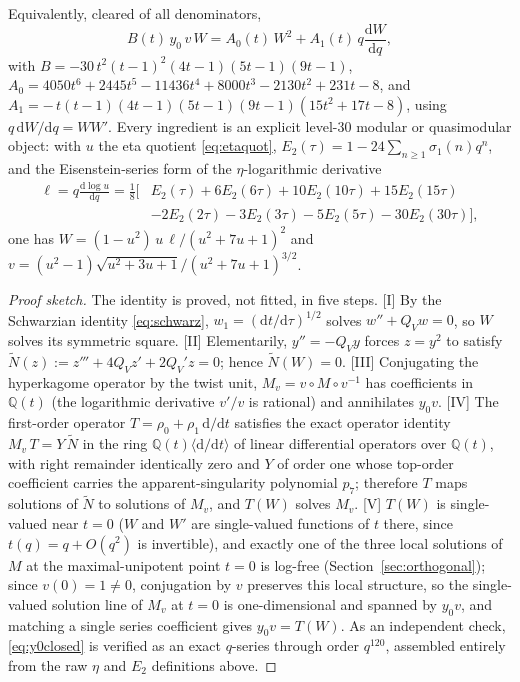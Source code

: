 \documentclass[cntp]{ipart}
\newcommand{\rmd}{\mathrm{d}}
\theoremstyle{plain}
\theoremstyle{remark}
\begin{document}
Equivalently, cleared of all denominators,
\begin{equation}
B(t)\,y_0\,v\,W=A_0(t)\,W^2+A_1(t)\,q\frac{\rmd W}{\rmd q},
\label{eq:y0poly}
\end{equation}
with $B=-30\,t^2(t-1)^2(4t-1)(5t-1)(9t-1)$,
$A_0=4050t^6+2445t^5-11436t^4+8000t^3-2130t^2+231t-8$, and
$A_1=-\,t(t-1)(4t-1)(5t-1)(9t-1)(15t^2+17t-8)$, using $q\,\rmd W/\rmd q=WW'$. Every ingredient
is an explicit level-30 modular or quasimodular object: with $u$ the eta quotient \eqref{eq:etaquot},
$E_2(\tau)=1-24\sum_{n\ge1}\sigma_1(n)q^n$, and the Eisenstein-series form of the $\eta$-logarithmic
derivative
\begin{equation}
\begin{split}
\ell=q\frac{\rmd\log u}{\rmd q}=\tfrac18\big[&E_2(\tau)+6E_2(6\tau)+10E_2(10\tau)+15E_2(15\tau)\\
&-2E_2(2\tau)-3E_2(3\tau)-5E_2(5\tau)-30E_2(30\tau)\big],
\end{split}
\label{eq:ell}
\end{equation}
one has $W=(1-u^2)\,u\,\ell/(u^2+7u+1)^2$ and $v=(u^2-1)\sqrt{u^2+3u+1}/(u^2+7u+1)^{3/2}$.

\begin{proof}[Proof sketch]
The identity is proved, not fitted, in five steps.
[I] By the Schwarzian identity \eqref{eq:schwarz}, $w_1=(\rmd t/\rmd\tau)^{1/2}$ solves
$w''+Q_Vw=0$, so $W$ solves its symmetric square.
[II] Elementarily, $y''=-Q_Vy$ forces $z=y^2$ to satisfy
$\widetilde N(z):=z'''+4Q_Vz'+2Q_V'z=0$; hence $\widetilde N(W)=0$.
[III] Conjugating the hyperkagome operator by the twist unit, $M_v=v\circ M\circ v^{-1}$ has
coefficients in $\mathbb{Q}(t)$ (the logarithmic derivative $v'/v$ is rational) and annihilates
$y_0v$.
[IV] The first-order operator $T=\rho_0+\rho_1\,\rmd/\rmd t$ satisfies the exact operator identity
$M_v\,T=Y\,\widetilde N$ in the ring $\mathbb{Q}(t)\langle\rmd/\rmd t\rangle$ of linear differential
operators over $\mathbb{Q}(t)$, with right remainder
identically zero and $Y$ of order one whose top-order coefficient carries the
apparent-singularity polynomial $p_7$; therefore $T$ maps solutions of $\widetilde N$ to
solutions of $M_v$, and $T(W)$ solves $M_v$.
[V] $T(W)$ is single-valued near $t=0$ ($W$ and $W'$ are single-valued functions of $t$ there,
since $t(q)=q+O(q^2)$ is invertible), and exactly one of the three local solutions of $M$ at the
maximal-unipotent point $t=0$ is log-free (Section~\ref{sec:orthogonal}); since $v(0)=1\neq0$,
conjugation by $v$ preserves this local structure, so the single-valued solution line of $M_v$
at $t=0$ is one-dimensional and spanned by $y_0v$, and matching a single
series coefficient gives $y_0v=T(W)$. As an independent check, \eqref{eq:y0closed} is verified as
an exact $q$-series through order $q^{120}$, assembled entirely from the raw $\eta$ and $E_2$
definitions above.
\end{proof}
\end{document}
